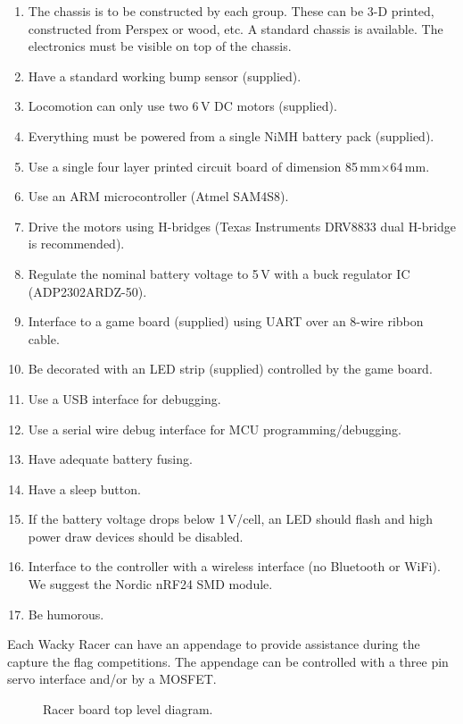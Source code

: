 \documentclass[11pt, a4paper]{article}
\begin{document}
\begin{enumerate}
\item The chassis is to be constructed by each group.  These can be 3-D printed,
  constructed from Perspex or wood, etc.  A standard chassis is available.  The
  electronics must be visible on top of the chassis.
\item Have a standard working bump sensor (supplied).  
\item Locomotion can only use two 6\,V DC motors (supplied).
\item Everything must be powered from a single NiMH battery pack (supplied).
\item Use a single four layer printed circuit board of dimension 85\,mm$\times$64\,mm.
\item Use an ARM microcontroller (Atmel SAM4S8).
\item Drive the motors using H-bridges (Texas Instruments DRV8833 dual
  H-bridge is recommended).
\item Regulate the nominal battery voltage to 5\,V with a buck
  regulator IC (ADP2302ARDZ-50).
\item Interface to a game board (supplied) using UART over an 8-wire
  ribbon cable.
\item Be decorated with an LED strip (supplied) controlled by the game board.
\item Use a USB interface for debugging.
\item Use a serial wire debug interface for MCU programming/debugging.
\item Have adequate battery fusing.
\item Have a sleep button.
\item If the battery voltage drops below 1\,V/cell, an LED should flash and high power draw devices should be disabled.
\item Interface to the controller with a wireless interface (no
  Bluetooth or WiFi).   We suggest the Nordic nRF24 SMD module.
\item Be humorous.    
\end{enumerate}


Each Wacky Racer can have an appendage to provide assistance during
the capture the flag competitions.  The appendage can be
controlled with a three pin servo interface and/or by a MOSFET.

\vspace{1cm}

\begin{figure}[h]
    \centering
    
    \caption{Racer board top level diagram.}
\end{figure}
\end{document}
